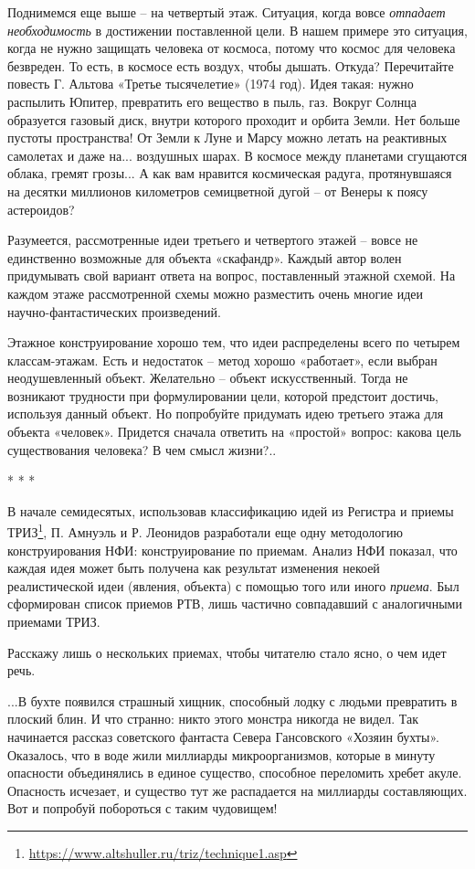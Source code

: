 \documentclass[11pt,a4paper]{article}
\begin{document}
Поднимемся еще выше -- на четвертый этаж. Ситуация, когда вовсе \emph{отпадает
  необходимость} в достижении поставленной цели. В нашем примере это ситуация,
когда не нужно защищать человека от космоса, потому что космос для человека
безвреден. То есть, в космосе есть воздух, чтобы дышать. Откуда? Перечитайте
повесть Г. Альтова «Третье тысячелетие» (1974 год). Идея такая: нужно распылить
Юпитер, превратить его вещество в пыль, газ. Вокруг Солнца образуется газовый
диск, внутри которого проходит и орбита Земли. Нет больше пустоты
пространства! От Земли к Луне и Марсу можно летать на реактивных самолетах и
даже на... воздушных шарах. В космосе между планетами сгущаются облака, гремят
грозы... А как вам нравится космическая радуга, протянувшаяся на десятки
миллионов километров семицветной дугой -- от Венеры к поясу астероидов?

Разумеется, рассмотренные идеи третьего и четвертого этажей -- вовсе не
единственно возможные для объекта «скафандр». Каждый автор волен придумывать
свой вариант ответа на вопрос, поставленный этажной схемой. На каждом этаже
рассмотренной схемы можно разместить очень многие идеи научно-фантастических
произведений.

Этажное конструирование хорошо тем, что идеи распределены всего по четырем
классам-этажам. Есть и недостаток -- метод хорошо «работает», если выбран
неодушевленный объект. Желательно -- объект искусственный. Тогда не возникают
трудности при формулировании цели, которой предстоит достичь, используя данный
объект. Но попробуйте придумать идею третьего этажа для объекта «человек».
Придется сначала ответить на «простой» вопрос: какова цель существования
человека? В чем смысл жизни?..

\begin{center}
  * * *
\end{center}
В начале семидесятых, использовав классификацию идей из Регистра и приемы
ТРИЗ\footnote{\url{https://www.altshuller.ru/triz/technique1.asp}}, П. Амнуэль
и Р. Леонидов разработали еще одну методологию конструирования НФИ:
конструирование по приемам. Анализ НФИ показал, что каждая идея может быть
получена как результат изменения некоей реалистической идеи (явления, объекта)
с помощью того или иного \emph{приема}. Был сформирован список приемов РТВ,
лишь частично совпадавший с аналогичными приемами ТРИЗ.

Расскажу лишь о нескольких приемах, чтобы читателю стало ясно, о чем идет
речь.

...В бухте появился страшный хищник, способный лодку с людьми превратить в
плоский блин. И что странно: никто этого монстра никогда не видел. Так
начинается рассказ советского фантаста Севера Гансовского «Хозяин бухты».
Оказалось, что в воде жили миллиарды микроорганизмов, которые в минуту
опасности объединялись в единое существо, способное переломить хребет акуле.
Опасность исчезает, и существо тут же распадается на миллиарды составляющих.
Вот и попробуй побороться с таким чудовищем!
\end{document}
